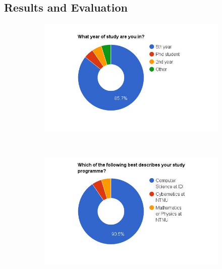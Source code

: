 \subsection{Results and Evaluation}

\begin{figure}
    \centering
    \begin{subfigure}[h]{0.48\textwidth}
        \centerline{\includegraphics[width=1.5\textwidth]{results/year_of_study.jpg}}
        \caption{}
        \label{fig:year-of-study}
    \end{subfigure}
    ~ %
    \hfill
    \begin{subfigure}[h]{0.48\textwidth}
        \centerline{\includegraphics[width=1.5\textwidth]{results/study_programme.jpg}}
        \caption{}
        \label{fig:study-programme}
    \end{subfigure}


\end{figure}
